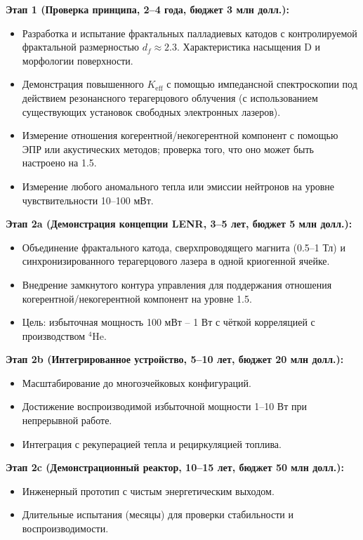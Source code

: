 \documentclass[12pt]{article}
\theoremstyle{remark}
\newcommand{\Keff}{K_{\mathrm{eff}}}
\begin{document}
	\textbf{Этап 1 (Проверка принципа, 2–4 года, бюджет 3 млн долл.):}
	\begin{itemize}
		\item Разработка и испытание фрактальных палладиевых катодов с контролируемой фрактальной размерностью \(d_f \approx 2.3\). Характеристика насыщения D и морфологии поверхности.
		\item Демонстрация повышенного \(\Keff\) с помощью импедансной спектроскопии под действием резонансного терагерцового облучения (с использованием существующих установок свободных электронных лазеров).
		\item Измерение отношения когерентной/некогерентной компонент с помощью ЭПР или акустических методов; проверка того, что оно может быть настроено на 1.5.
		\item Измерение любого аномального тепла или эмиссии нейтронов на уровне чувствительности 10–100 мВт.
	\end{itemize}
	
	\textbf{Этап 2a (Демонстрация концепции LENR, 3–5 лет, бюджет 5 млн долл.):}
	\begin{itemize}
		\item Объединение фрактального катода, сверхпроводящего магнита (0.5–1 Тл) и синхронизированного терагерцового лазера в одной криогенной ячейке.
		\item Внедрение замкнутого контура управления для поддержания отношения когерентной/некогерентной компонент на уровне 1.5.
		\item Цель: избыточная мощность 100 мВт – 1 Вт с чёткой корреляцией с производством \(^4\)He.
	\end{itemize}
	
	\textbf{Этап 2b (Интегрированное устройство, 5–10 лет, бюджет 20 млн долл.):}
	\begin{itemize}
		\item Масштабирование до многозчейковых конфигураций.
		\item Достижение воспроизводимой избыточной мощности 1–10 Вт при непрерывной работе.
		\item Интеграция с рекуперацией тепла и рециркуляцией топлива.
	\end{itemize}
	
	\textbf{Этап 2c (Демонстрационный реактор, 10–15 лет, бюджет 50 млн долл.):}
	\begin{itemize}
		\item Инженерный прототип с чистым энергетическим выходом.
		\item Длительные испытания (месяцы) для проверки стабильности и воспроизводимости.
	\end{itemize}
	
\end{document}
